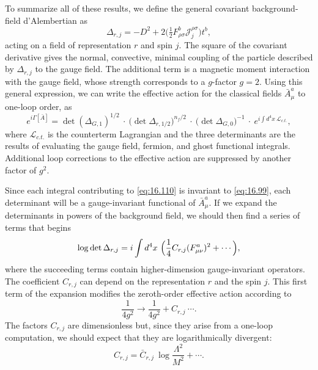 To summarize all of these results, we define the general covariant
background-field d'Alembertian as
\begin{equation}
  \Delta_{r,j} = -D^2 + 2\bigl( \tfrac{1}{2}F^b_{\rho\sigma}
    \mathcal{J}^{\rho\sigma}_j \bigr)t^b ,
  \label{eq:16.109}
\end{equation}
acting on a field of representation $r$ and spin $j$.  The square of the
covariant derivative gives the normal, convective, minimal coupling of the
particle described by $\Delta_{r,j}$ to the gauge field.  The additional term
is a magnetic moment interaction with the gauge field, whose strength
corresponds to a $g$-factor $g = 2$.  Using this general expression, we can
write the effective action for the classical fields $\bar{A}^a_\mu$ to
one-loop order, as
\begin{equation}
  e^{i\Gamma[\bar{A}]} = \det(\Delta_{G,1})^{1/2}\ \cdot\
    \bigl( \det\Delta_{r,1/2} \bigr)^{n_f/2}\ \cdot\
    \bigl( \det\Delta_{G,0} \bigr)^{-1}\ \cdot\ e^{i\int d^4x\
      \mathcal{L}_{c.t.}} ,
  \label{eq:16.110}
\end{equation}
where $\mathcal{L}_{c.t.}$ is the counterterm Lagrangian and the three
determinants are the results of evaluating the gauge field, fermion, and
ghost functional integrals.  Additional loop corrections to the effective
action are suppressed by another factor of $g^2$.

Since each integral contributing to \eqref{eq:16.110} is invariant to
\eqref{eq:16.99}, each determinant will be a gauge-invariant functional of
$\bar{A}^a_\mu$.  If we expand the determinants in powers of the background
field, we should then find a series of terms that begins
\begin{equation}
  \log\det\Delta_{r,j} = i\int d^4x\ \Bigl( \frac{1}{4}C_{r,j}(F^a_{\mu\nu})^2
    + \cdots \Bigr) ,
  \label{eq:16.111}
\end{equation}
where the succeeding terms contain higher-dimension gauge-invariant
operators.  The coefficient $C_{r,j}$ can depend on the representation $r$ and
the spin $j$.  This first term of the expansion modifies the zeroth-order
effective action according to
\begin{equation}
  \frac{1}{4g^2} \to \frac{1}{4g^2} + C_{r,j}\ \cdots .
  \label{eq:16.117}
\end{equation}
The factors $C_{r,j}$ are dimensionless but, since they arise from a
one-loop computation, we should expect that they are logarithmically
divergent:
\begin{equation}
  C_{r,j} = \bar{C}_{r,j}\ \log\frac{\Lambda^2}{M^2} + \cdots .
\end{equation}

